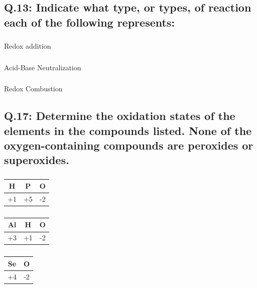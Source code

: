 \documentclass[10pt, letterpaper]{article}
\begin{document}
\subsection*{Q.13: Indicate what type, or types,
of reaction each of the following represents:}
\subsubsection*{}
Redox addition
\subsubsection*{}
Acid-Base Neutralization 
\subsubsection*{}
Redox Combustion
\subsection*{Q.17: Determine the oxidation states of the elements in the
compounds listed. None of the oxygen-containing
compounds are peroxides or superoxides.}
\subsubsection*{}
\begin{center}
	\begin{tabular}{|c|c|c|}
		\hline
		H & P & O \\
		\hline
		+1 & +5 & -2 \\
		\hline
	\end{tabular}
\end{center}
\subsubsection*{}
\begin{center}
	\begin{tabular}{|c|c|c|}
		\hline
		Al & H & O \\
		\hline
		+3 & +1 & -2 \\
		\hline
	\end{tabular}
\end{center}
\subsubsection*{}
\begin{center}
	\begin{tabular}{|c|c|}
		\hline
		Se & O \\
		\hline
		+4 & -2 \\
		\hline
	\end{tabular}
\end{center}
\end{document}
